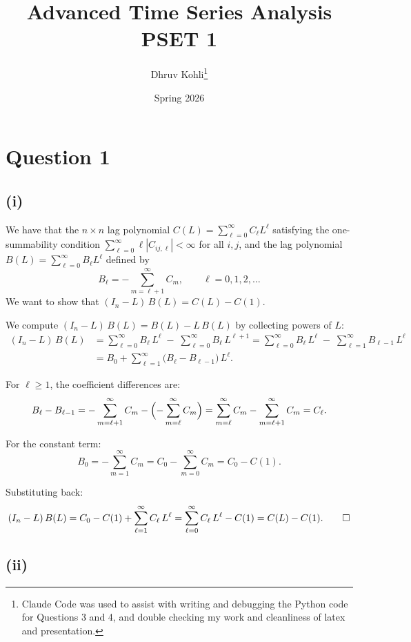 \documentclass[11pt]{article}
\title{Advanced Time Series Analysis PSET 1}
\author{Dhruv Kohli\thanks{Claude Code was used to assist with writing and debugging the Python code for Questions 3 and 4, and double checking my work and cleanliness of latex and presentation.}}
\date{Spring 2026}
\begin{document}
\maketitle

\section{Question 1}

\subsection{(i)}

We have that the $n\times n$ lag polynomial $C(L) = \sum_{\ell=0}^{\infty} C_\ell L^\ell$ satisfying the one-summability condition $\sum_{\ell=0}^{\infty} \ell |C_{ij,\ell}| < \infty$ for all $i,j$, and the lag polynomial $B(L) = \sum_{\ell=0}^{\infty} B_\ell L^\ell$ defined by
\[
B_\ell = -\sum_{m=\ell+1}^{\infty} C_m, \qquad \ell = 0,1,2,\ldots
\]
We want to show that $(I_n - L)\,B(L) = C(L) - C(1)$.

We compute $(I_n - L)\,B(L) = B(L) - L\,B(L)$ by collecting powers of $L$:
\begin{align*}
(I_n - L)\,B(L)
&= \sum_{\ell=0}^{\infty} B_\ell\, L^\ell \;-\; \sum_{\ell=0}^{\infty} B_\ell\, L^{\ell+1}
= \sum_{\ell=0}^{\infty} B_\ell\, L^\ell \;-\; \sum_{\ell=1}^{\infty} B_{\ell-1}\, L^{\ell} \\
&= B_0 + \sum_{\ell=1}^{\infty} \bigl(B_\ell - B_{\ell-1}\bigr)\, L^{\ell}.
\end{align*}

For $\ell \geq 1$, the coefficient differences are:
\[
B_\ell - B_{\ell-1}
= -\sum_{m=\ell+1}^{\infty} C_m - \Bigl(-\sum_{m=\ell}^{\infty} C_m\Bigr)
= \sum_{m=\ell}^{\infty} C_m - \sum_{m=\ell+1}^{\infty} C_m = C_\ell.
\]

For the constant term:
\[
B_0 = -\sum_{m=1}^{\infty} C_m
= C_0 - \sum_{m=0}^{\infty} C_m
= C_0 - C(1).
\]

Substituting back:
\[
(I_n - L)\,B(L) = C_0 - C(1) + \sum_{\ell=1}^{\infty} C_\ell\, L^\ell
= \sum_{\ell=0}^{\infty} C_\ell\, L^\ell - C(1)
= C(L) - C(1). \qedhere
\]

\subsection{(ii)}
\end{document}
